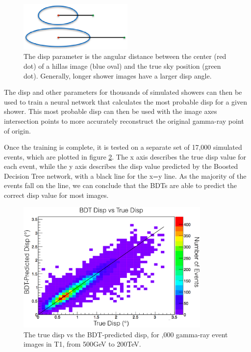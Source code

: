 \begin{figure}[ht]
  \begin{center}
    \includegraphics[width=0.5\textwidth]{images/disp_parameter_cropped.eps}
    \caption[Angular Reconstruction Disp]{The disp parameter is the angular distance between the center (red dot) of a hillas image (blue oval) and the true sky position (green dot).  Generally, longer shower images have a larger disp angle.}\label{fig:dispdiagram}
  \end{center}
\end{figure}

The disp and other parameters for thousands of simulated showers can then be used to train a neural network that calculates the most probable disp for a given shower.
This most probable disp can then be used with the image axes intersection points to more accurately reconstruct the original gamma-ray point of origin.

Once the training is complete, it is tested on a separate set of 17,000 simulated events, which are plotted in figure \ref{fig:disptraining}.
The x axis describes the true disp value for each event, while the y axis describes the disp value predicted by the Boosted Decision Tree network, with a black line for the x=y line.
As the majority of the events fall on the line, we can conclude that the BDTs are able to predict the correct disp value for most images.

\begin{figure}[ht]
  \begin{center}
    \includegraphics[width=0.85\textwidth]{images/disp_training.eps}
    \caption[Disp BDT Training]{The true disp vs the BDT-predicted disp, for ,000 gamma-ray event images in T1, from 500GeV to 200TeV.}\label{fig:disptraining}
  \end{center}
\end{figure}

